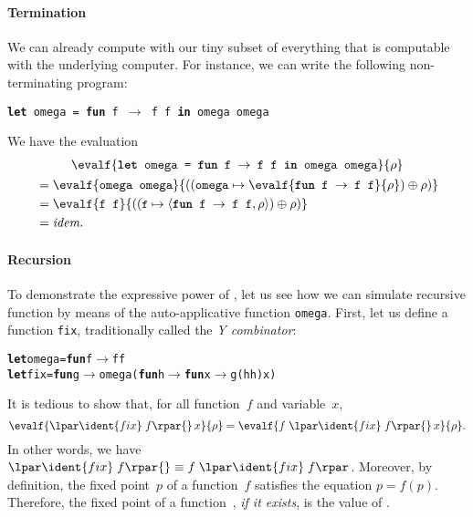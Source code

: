 \paragraph{Termination}

We can already compute with our tiny subset of \OCaml everything that
is computable with the underlying computer. For instance, we can write
the following non\hyp{}terminating program:
\begin{center}
\texttt{\textbf{let} omega = \textbf{fun} f \(\rightarrow\) f f \textbf{in} omega omega}
\end{center}
We have the evaluation
\begin{gather*}
\evalf{\texttt{\textbf{let} omega = \textbf{fun} f \(\rightarrow\) f f \textbf{in} omega omega}}{\rho}\\
\begin{align*}
&= \evalf{\texttt{omega omega}}{((\texttt{omega} \mapsto
\evalf{\texttt{\textbf{fun} f \(\rightarrow\) f f}}{\rho}) \oplus \rho)}\\
&= \evalf{\texttt{f f}}{((\texttt{\small f} \mapsto
    \langle\texttt{\textbf{fun} f \(\rightarrow\) f f},\rho\rangle) \oplus \rho)}\\
&= \text{\emph{idem.}}
\end{align*}
\end{gather*}

\paragraph{Recursion}

To demonstrate the expressive power of \OCaml, let us see how we can
simulate recursive function by means of the auto\hyp{}applicative
function \texttt{omega}. First, let us define a function \texttt{fix},
traditionally called the \emph{Y combinator}:
\begin{alltt}
\textbf{let} omega = \textbf{fun} f \(\rightarrow\) f f
\textbf{let} fix = \textbf{fun} g \(\rightarrow\) omega (\textbf{fun} h \(\rightarrow\) \textbf{fun} x \(\rightarrow\) g (h h) x)
\end{alltt}

\noindent It is tedious to show that, for all function~\(f\) and
variable~\(x\),
\begin{equation*}
\evalf{\lpar\ident{fix} \; f\rpar{} \, x}{\rho} = \evalf{f \;
  \lpar\ident{fix} \; f\rpar{} \, x}{\rho}.
\end{equation*}
In other words, we have $\lpar\ident{fix} \; f\rpar{} \equiv f \;
\lpar\ident{fix} \; f\rpar$. Moreover, by definition, the fixed
point~\(p\) of a function~\(f\) satisfies the equation \(p =
f(p)\). Therefore, the fixed point of a function~, \emph{if
  it exists}, is the value of \lpar{} \rpar{}.

